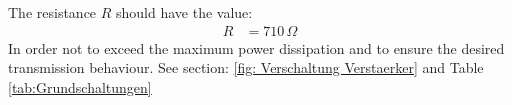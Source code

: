{    The resistance $R$ should have the value:
    \begin{align*}
        R &= 710\,\Omega
    \end{align*}
    In order not to exceed the maximum power dissipation and to ensure the desired transmission behaviour.
%        
%        
%        
%        
%        
%        
%        
%        
%        
See section: \ref{fig: Verschaltung Verstaerker} and Table \ref{tab:Grundschaltungen}

    }